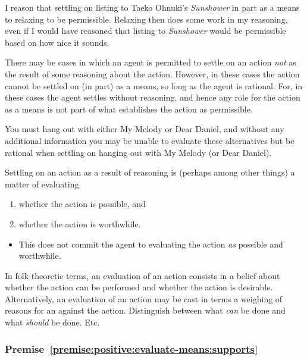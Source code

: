 \documentclass[10pt]{article}
\newcommand{\hand}{\ding{43}}
\newcommand{\hozlinedash}[0]{%
  \noindent\hdashrule[0.5ex][c]{\textwidth}{.1pt}{2.5pt}
}
\begin{document}
\begin{example}
  I reason that settling on listing to Taeko Ohnuki's \emph{Sunshower} in part as a means to relaxing to be permissible.
  Relaxing then does some work in my reasoning, even if I would have reasoned that listing to \emph{Sunshower} would be permissible based on how nice it sounds.
\end{example}

There may be cases in which an agent is permitted to settle on an action \emph{not} as the result of some reasoning about the action.
However, in these cases the action cannot be settled on (in part) as a means, so long as the agent is rational.
For, in these cases the agent settles without reasoning, and hence any role for the action as a means is not part of what establishes the action as permissible.

\begin{example}
  You must hang out with either My Melody or Dear Daniel, and without any additional information you may be unable to evaluate these alternatives but be rational when settling on hanging out with My Melody (or Dear Daniel).
\end{example}



\hozlinedash

Settling on an action as a result of reasoning is (perhaps among other things) a matter of evaluating
\begin{enumerate}
\item whether the action is possible, and
\item whether the action is worthwhile.
\end{enumerate}

\begin{itemize}
\item[\hand] This does not commit the agent to evaluating the action \emph{as} possible and worthwhile.
\end{itemize}

In folk-theoretic terms, an evaluation of an action consists in a belief about whether the action can be performed and whether the action is desirable.
Alternatively, an evaluation of an action may be cast in terms a weighing of reasons for an against the action.
Distinguish between what \emph{can} be done and what \emph{should} be done.
Etc.

\subsubsection{Premise~\ref{premise:positive:evaluate-means:supports}}
\label{sec:premise:positive:evaluate-means:supports}
\end{document}
